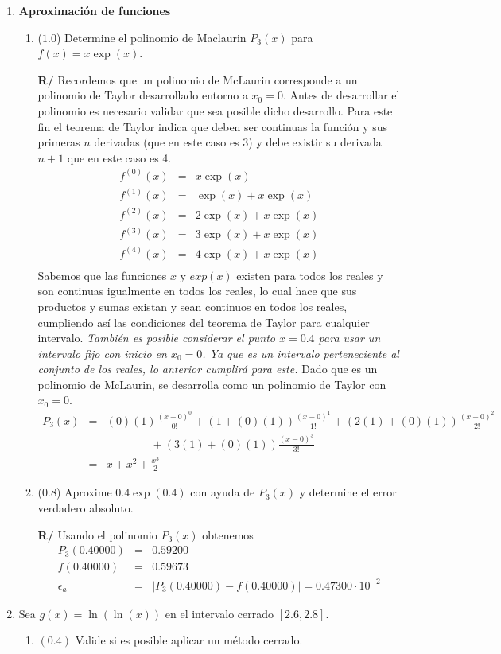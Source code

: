 \documentclass[12pt]{article}
\begin{document}
  \begin{enumerate}[leftmargin=*,widest=9]
    \item \textbf{Aproximación de funciones}
    \begin{enumerate}[label=\alph*]
    \item (\(1.0\)) Determine el polinomio de Maclaurin \(P_3(x)\) para \(f(x) = x \exp(x) \).

\textbf{R/} Recordemos que un polinomio de McLaurin corresponde a un polinomio de Taylor desarrollado entorno a \(x_0=0\). Antes de desarrollar el polinomio es necesario validar que sea posible dicho desarrollo.
   Para este fin el teorema de Taylor indica que deben ser continuas la función y sus primeras \(n\) derivadas (que en este caso es 3) y debe existir su derivada \(n+1\) que en este caso es 4.
   \begin{eqnarray*}
   f^{(0)}(x) &=& x \exp(x) \\
   f^{(1)}(x) &=& \exp(x) + x \exp(x) \\
   f^{(2)}(x) &=& 2\exp(x) + x \exp(x) \\
   f^{(3)}(x) &=& 3\exp(x) + x \exp(x) \\
   f^{(4)}(x) &=& 4\exp(x) + x \exp(x) \\
   \end{eqnarray*}
   Sabemos que las funciones \(x\) y \(exp(x)\) existen para todos los reales y son continuas igualmente en todos los reales, lo cual hace que sus productos y sumas existan y sean continuos en todos los reales, cumpliendo así las condiciones del teorema de Taylor para cualquier intervalo.
\textit{También es posible considerar el punto \(x = 0.4\) para usar un intervalo fijo con inicio en \(x_0=0\). Ya que es un intervalo perteneciente al conjunto de los reales, lo anterior cumplirá para este.}
Dado que es un polinomio de McLaurin, se desarrolla como un polinomio de Taylor con \(x_0=0\).
\begin{eqnarray*}
P_3(x) & = & (0)(1) \frac{(x-0)^0}{0!} + (1 + (0)(1)) \frac{(x-0)^1}{1!} + (2(1) + (0)(1)) \frac{(x-0)^2}{2!} \\
&& \qquad \qquad + (3(1) + (0)(1)) \frac{(x-0)^3}{3!}\\
& = & x + x^2 + \frac{x^3}{2}
\end{eqnarray*}
    \item (\(0.8\)) Aproxime \(0.4 \exp(0.4)\) con ayuda de \(P_3(x)\) y determine el error verdadero absoluto.

\textbf{R/} Usando el polinomio \(P_3(x)\) obtenemos
   \begin{eqnarray*}
   P_3(0.40000) & = & 0.59200 \\
   f(0.40000) & = & 0.59673 \\
   \epsilon_a & = & | P_3(0.40000) - f(0.40000) | = 0.47300 \cdot 10^{-2}
\end{eqnarray*}      
   \end{enumerate}
   \item Sea \(g(x) = \ln(\ln(x)) \) en el intervalo cerrado \( [2.6, 2.8] \).
   \begin{enumerate}[label=\alph*]
   \item \((0.4)\) Valide si es posible aplicar un método cerrado.


\end{enumerate}
\end{enumerate}
\end{document}
